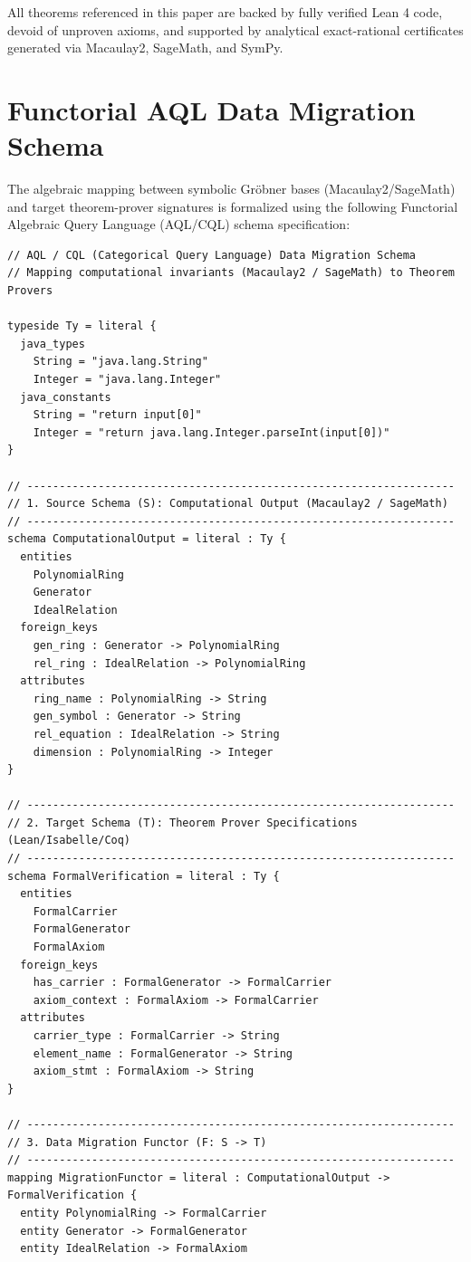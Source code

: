 \documentclass[11pt,a4paper]{article}
\begin{document}
All theorems referenced in this paper are backed by fully verified Lean 4 code, devoid of unproven axioms, and supported by analytical exact-rational certificates generated via Macaulay2, SageMath, and SymPy. 

\section{Functorial AQL Data Migration Schema}
The algebraic mapping between symbolic Gröbner bases (Macaulay2/SageMath) and target theorem-prover signatures is formalized using the following Functorial Algebraic Query Language (AQL/CQL) schema specification:

\begin{verbatim}
// AQL / CQL (Categorical Query Language) Data Migration Schema
// Mapping computational invariants (Macaulay2 / SageMath) to Theorem Provers

typeside Ty = literal {
  java_types
    String = "java.lang.String"
    Integer = "java.lang.Integer"
  java_constants
    String = "return input[0]"
    Integer = "return java.lang.Integer.parseInt(input[0])"
}

// ------------------------------------------------------------------
// 1. Source Schema (S): Computational Output (Macaulay2 / SageMath)
// ------------------------------------------------------------------
schema ComputationalOutput = literal : Ty {
  entities
    PolynomialRing
    Generator
    IdealRelation
  foreign_keys
    gen_ring : Generator -> PolynomialRing
    rel_ring : IdealRelation -> PolynomialRing
  attributes
    ring_name : PolynomialRing -> String
    gen_symbol : Generator -> String
    rel_equation : IdealRelation -> String
    dimension : PolynomialRing -> Integer
}

// ------------------------------------------------------------------
// 2. Target Schema (T): Theorem Prover Specifications (Lean/Isabelle/Coq)
// ------------------------------------------------------------------
schema FormalVerification = literal : Ty {
  entities
    FormalCarrier
    FormalGenerator
    FormalAxiom
  foreign_keys
    has_carrier : FormalGenerator -> FormalCarrier
    axiom_context : FormalAxiom -> FormalCarrier
  attributes
    carrier_type : FormalCarrier -> String
    element_name : FormalGenerator -> String
    axiom_stmt : FormalAxiom -> String
}

// ------------------------------------------------------------------
// 3. Data Migration Functor (F: S -> T)
// ------------------------------------------------------------------
mapping MigrationFunctor = literal : ComputationalOutput -> FormalVerification {
  entity PolynomialRing -> FormalCarrier
  entity Generator -> FormalGenerator
  entity IdealRelation -> FormalAxiom


\end{verbatim}
\end{document}
